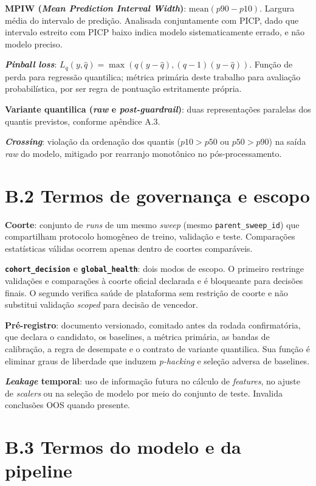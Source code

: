 \textbf{MPIW (\textit{Mean Prediction Interval Width})}: \(\text{mean}(p90 - p10)\). Largura média do intervalo de predição. Analisada conjuntamente com PICP, dado que intervalo estreito com PICP baixo indica modelo sistematicamente errado, e não modelo preciso.

\textbf{\textit{Pinball loss}}: \(L_q(y, \hat{q}) = \max(q (y - \hat{q}), (q - 1)(y - \hat{q}))\). Função de perda para regressão quantilica; métrica primária deste trabalho para avaliação probabilística, por ser regra de pontuação estritamente própria.

\textbf{Variante quantilica (\textit{raw} e \textit{post-guardrail})}: duas representações paralelas dos quantis previstos, conforme apêndice A.3.

\textbf{\textit{Crossing}}: violação da ordenação dos quantis (\(p10 > p50\) ou \(p50 > p90\)) na saída \textit{raw} do modelo, mitigado por rearranjo monotônico no pós-processamento.

\section*{B.2 Termos de governança e escopo}

\textbf{Coorte}: conjunto de \textit{runs} de um mesmo \textit{sweep} (mesmo \texttt{parent\_sweep\_id}) que compartilham protocolo homogêneo de treino, validação e teste. Comparações estatísticas válidas ocorrem apenas dentro de coortes comparáveis.

\textbf{\texttt{cohort\_decision} e \texttt{global\_health}}: dois modos de escopo. O primeiro restringe validações e comparações à coorte oficial declarada e é bloqueante para decisões finais. O segundo verifica saúde de plataforma sem restrição de coorte e não substitui validação \textit{scoped} para decisão de vencedor.

\textbf{Pré-registro}: documento versionado, comitado antes da rodada confirmatória, que declara o candidato, os baselines, a métrica primária, as bandas de calibração, a regra de desempate e o contrato de variante quantilica. Sua função é eliminar graus de liberdade que induzem \textit{p-hacking} e seleção adversa de baselines.

\textbf{\textit{Leakage} temporal}: uso de informação futura no cálculo de \textit{features}, no ajuste de \textit{scalers} ou na seleção de modelo por meio do conjunto de teste. Invalida conclusões OOS quando presente.

\section*{B.3 Termos do modelo e da pipeline}

